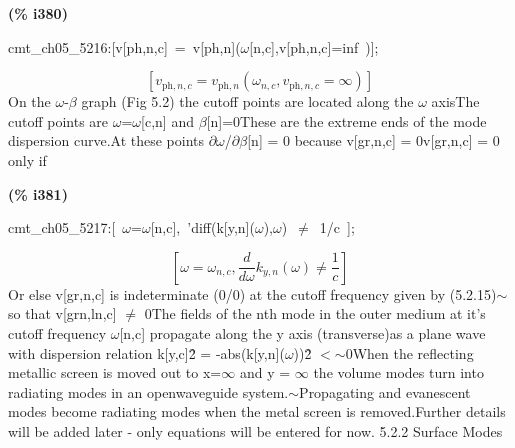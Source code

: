 \documentclass[fleqn]{article}
\begin{document}
\noindent
\begin{minipage}[t]{4.000000em}\color{red}\bfseries
(\% i380)	
\end{minipage}
\begin{minipage}[t]{\textwidth}\color{blue}
cmt\_ch05\_5216:[v[ph,n,c]\ =\ v[ph,n](\ensuremath{\omega}[n,c],v[ph,n,c]=inf\ )];
\end{minipage}
\[\displaystyle \tag{\% o380} 
\left[ {v_{\ensuremath{\mathrm{ph}},n,c}}={v_{\ensuremath{\mathrm{ph}},n}}\left( {{\omega }_{n,c}}\operatorname{,}{v_{\ensuremath{\mathrm{ph}},n,c}}=\infty \right) \right] \mbox{}
\]
On the \ensuremath{\omega}-\ensuremath{\beta} graph (Fig 5.2) the cutoff points are located along the \ensuremath{\omega} axisThe  cutoff points are \ensuremath{\omega}=\ensuremath{\omega}[c,n] and \ensuremath{\beta}[n]=0These are the extreme ends of the mode dispersion curve.At these points \ensuremath{\partial}\ensuremath{\omega}/\ensuremath{\partial}\ensuremath{\beta}[n] = 0 because v[gr,n,c] = 0v[gr,n,c] = 0 only if


\noindent
\begin{minipage}[t]{4.000000em}\color{red}\bfseries
(\% i381)	
\end{minipage}
\begin{minipage}[t]{\textwidth}\color{blue}
cmt\_ch05\_5217:[\ \ensuremath{\omega}=\ensuremath{\omega}[n,c],\ 'diff(k[y,n](\ensuremath{\omega}),\ensuremath{\omega})\ \ensuremath{\neq}\ 1/c\ ];
\end{minipage}
\[\displaystyle \tag{\% o381} 
\left[ \omega ={{\omega }_{n,c}}\operatorname{,}\frac{d}{d \omega } {k_{y,n}}\left( \omega \right) \operatorname{\neq }\frac{1}{c}\right] \mbox{}
\]
Or else  v[gr,n,c] is indeterminate (0/0) at the cutoff frequency given by (5.2.15)\ensuremath{\sim }so that v[grn,ln,c] \ensuremath{\neq} 0The fields of the nth mode in the outer medium at it's cutoff frequency \ensuremath{\omega}[n,c] propagate along the y axis (transverse)as a plane wave with dispersion relation k[y,c]\^ 2 = -abs(k[y,n](\ensuremath{\omega}))\^ 2 \ensuremath{<}\ensuremath{\sim }0When the reflecting metallic screen is moved out to x=\ensuremath{\infty} and y = \ensuremath{\infty} the volume modes turn into radiating modes in an openwaveguide system.\ensuremath{\sim }Propagating and evanescent modes become radiating modes when the metal screen is removed.Further details will be added later - only equations will be entered for now.
5.2.2 Surface Modes
\end{document}
